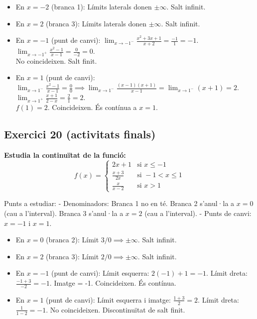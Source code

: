 \documentclass[12pt,a4paper]{article}
\begin{document}
\begin{itemize}
    \item En $x=-2$ (branca 1): Límits laterals donen $\pm\infty$. Salt infinit.
    \item En $x=2$ (branca 3): Límits laterals donen $\pm\infty$. Salt infinit.
    \item En $x=-1$ (punt de canvi): 
    $\lim_{x \to -1^-} \frac{x^2+3x+1}{x+2} = \frac{-1}{1} = -1$. \\
    $\lim_{x \to -1^+} \frac{x^2-1}{x-1} = \frac{0}{-2} = 0$. \\
    No coincideixen. Salt finit.
    \item En $x=1$ (punt de canvi):
    $\lim_{x \to 1^-} \frac{x^2-1}{x-1} = \frac{0}{0} \implies \lim_{x \to 1^-} \frac{(x-1)(x+1)}{x-1} = \lim_{x \to 1^-} (x+1) = 2$. \\
    $\lim_{x \to 1^+} \frac{x+1}{2-x} = \frac{2}{1} = 2$. \\
    $f(1) = 2$. Coincideixen. És contínua a $x=1$.
\end{itemize}

\vspace{0.5cm}

\subsection{Exercici 20 (activitats finals)}

\textbf{Estudia la continuïtat de la funció:}
\[ f(x) = \begin{cases} 2x+1 & \text{si } x \le -1 \\ \frac{x+3}{2x} & \text{si } -1 < x \le 1 \\ \frac{x}{x-2} & \text{si } x > 1 \end{cases} \]

Punts a estudiar:
- Denominadors: Branca 1 no en té. Branca 2 s'anul·la a $x=0$ (cau a l'interval). Branca 3 s'anul·la a $x=2$ (cau a l'interval).
- Punts de canvi: $x=-1$ i $x=1$.

\begin{itemize}
    \item En $x=0$ (branca 2): Límit $3/0 \implies \pm\infty$. Salt infinit.
    \item En $x=2$ (branca 3): Límit $2/0 \implies \pm\infty$. Salt infinit.
    \item En $x=-1$ (punt de canvi):
    Límit esquerra: $2(-1)+1 = -1$.
    Límit dreta: $\frac{-1+3}{-2} = -1$.
    Imatge = -1. Coincideixen. És contínua.
    \item En $x=1$ (punt de canvi):
    Límit esquerra i imatge: $\frac{1+3}{2} = 2$.
    Límit dreta: $\frac{1}{1-2} = -1$.
    No coincideixen. Discontinuïtat de salt finit.
\end{itemize}
\end{document}
